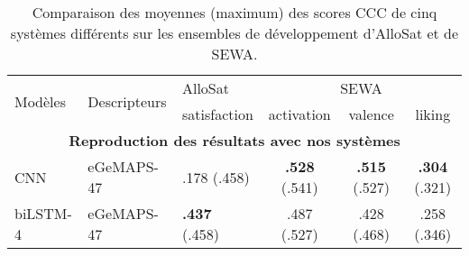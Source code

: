 \begin{table}[h]
  \centering
\begin{tabular}{|l|l|l|c|c|c|}
\hline
\multirow{2}{*}{Modèles} & \multirow{2}{*}{Descripteurs} & AlloSat                               & \multicolumn{3}{c|}{SEWA}                                                                                             \\ \cline{3-6}
                         &                               & satisfaction                          & activation                            & valence                               & liking                                \\ \hline
\multicolumn{6}{|c|}{\textbf{Reproduction des résultats avec nos systèmes}}                                                                                                                                              \\ \hline
CNN                      & eGeMAPS-47                    & .178 (.458)                           & \textbf{.528} (.541) & \textbf{.515} (.527) & \textbf{.304} (.321) \\
biLSTM-4                 & eGeMAPS-47                    & \textbf{.437} (.458) & .487 (.527)                           & .428 (.468)                           & .258 (.346)                           \\ \hline
\end{tabular}
\caption{Comparaison des moyennes (maximum) des scores CCC de cinq systèmes différents sur les ensembles de développement d'AlloSat et de SEWA.}
\label{tab:cnnVSbilstm}
\end{table}
